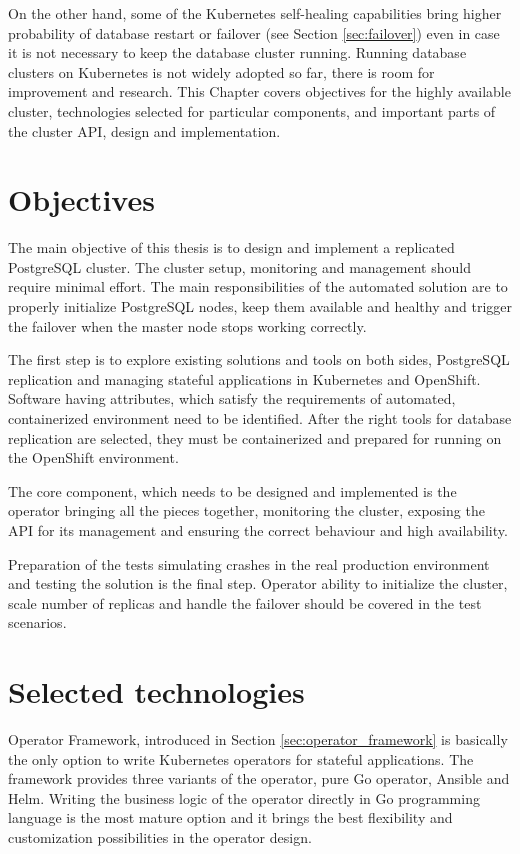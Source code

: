 \documentclass[
  digital, %
  twoside, %
  table,   %
  nolof,   %
  nolot,   %
]{fithesis3}
\begin{document}
On the other hand, some of the Kubernetes self-healing capabilities bring higher probability of database restart or failover (see Section \ref{sec:failover}) even in case it is not necessary to keep the database cluster running. Running database clusters on Kubernetes is not widely adopted so far, there is room for improvement and research.
This Chapter covers objectives for the highly available cluster, technologies selected for particular components, and important parts of the cluster API, design and implementation.

\section{Objectives}
The main objective of this thesis is to design and implement a replicated PostgreSQL cluster. The cluster setup, monitoring and management should require minimal effort. The main responsibilities of the automated solution are to properly initialize PostgreSQL nodes, keep them available and healthy and trigger the failover when the master node stops working correctly.

The first step is to explore existing solutions and tools on both sides, PostgreSQL replication and managing stateful applications in Kubernetes and OpenShift. Software having attributes, which satisfy the requirements of automated, containerized environment need to be identified. After the right tools for database replication are selected, they must be containerized and prepared for running on the OpenShift environment.

The core component, which needs to be designed and implemented is the operator bringing all the pieces together, monitoring the cluster, exposing the API for its management and ensuring the correct behaviour and high availability.

Preparation of the tests simulating crashes in the real production environment and testing the solution is the final step. Operator ability to initialize the cluster, scale number of replicas and handle the failover should be covered in the test scenarios.


\section{Selected technologies} \label{sec:selected_technologies}
Operator Framework, introduced in Section \ref{sec:operator_framework} is basically the only option to write Kubernetes operators for stateful applications. The framework provides three variants of the operator, pure Go operator, Ansible and Helm. Writing the business logic of the operator directly in Go programming language is the most mature option and it brings the best flexibility and customization possibilities in the operator design.
\end{document}
